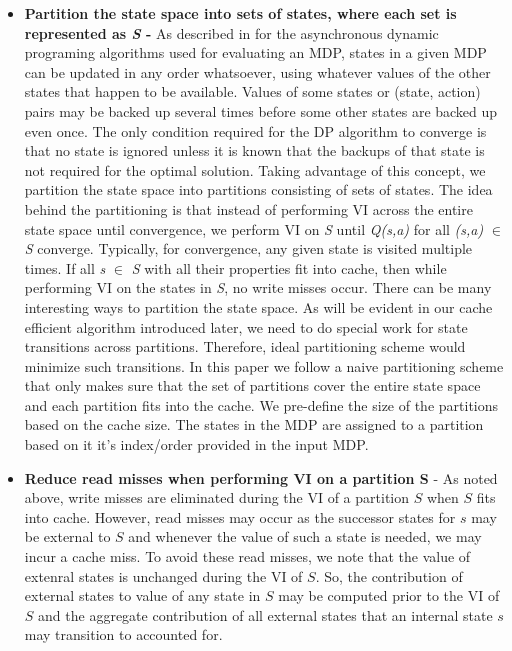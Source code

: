 \documentclass[conference]{IEEEtran}
\begin{document}
\begin{itemize}
\item \textbf{Partition the state space into sets of states, where each set is represented as \textit{S}  - } As described in \cite{suttonbook} for the asynchronous dynamic programing algorithms used for evaluating an MDP, states in a given MDP can be updated in any order whatsoever, using whatever values of the other states that happen to be available. Values of some states or (state, action) pairs may be backed up several times before some other states are backed up even once. The only condition required for the DP algorithm to converge is that no state is ignored unless it is known that the backups of that state is not required for the optimal solution. Taking advantage of this concept, we partition the state space into partitions consisting of sets of states. The idea behind the partitioning is that instead of performing VI across the entire state space until convergence, we perform VI on \textit{S} until \textit{Q(s,a)} for all \textit{(s,a)} $\in$ \textit{S} converge. Typically, for convergence, any given state is visited multiple times. If all \textit{s} $\in$ \textit{S} with all their properties fit into cache, then while performing VI on the states in \textit{S}, no write misses occur. There can be many interesting ways to partition the state space. As will be evident in our cache efficient algorithm introduced later, we need to do special work for state transitions across partitions. Therefore, ideal partitioning scheme would minimize such transitions. In this paper we follow a naive partitioning scheme that only makes sure that the set of partitions cover the entire state space and each partition fits into the cache. We pre-define the size of the partitions based on the cache size. The states in the MDP are assigned to a partition based on it it's index/order provided in the input MDP.

\item \textbf{Reduce read misses when performing VI on a partition S} - As noted above, write misses are eliminated during the VI of a partition $S$ when $S$ fits into cache. However, read misses may occur as the successor states for $s$
may be external to $S$ and whenever the value of such a state is needed, we may incur a cache miss. To avoid these read misses, we note that the value of extenral states is unchanged during the VI of $S$. So, the contribution of external states to value of any state in $S$ may be computed prior to the VI of $S$ and the
aggregate contribution of all external states that an internal state $s$ may transition to accounted for.
\end{itemize}
\end{document}
